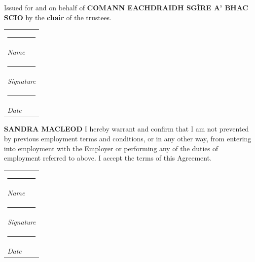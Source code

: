 \documentclass[a4paper,11pt,onecolumn ]{article}
\makeatletter
\newcommand{\namesigdate}[2][5cm]{%
  \begin{tabular}{@{}p{#1}@{}}
    #2 \\[2\normalbaselineskip] \hrule \\[0pt]
    {\small \textit{Name}} \\[2\normalbaselineskip] \hrule \\[0pt]
    {\small \textit{Signature}} \\[2\normalbaselineskip] \hrule \\[0pt]
    {\small \textit{Date}}
  \end{tabular}
}
\makeatother
\begin{document}
\begin{center}
    
\begin{multicols}{2}
\begin{center}
Issued for and on behalf of \textbf{COMANN EACHDRAIDH SGÌRE A' BHAC SCIO} by the
\textbf{chair} of the trustees.
\end{center}


\noindent
\namesigdate{}

\columnbreak

\begin{center}
\textbf{SANDRA MACLEOD}
I hereby warrant and confirm that I am not prevented by previous employment terms
and conditions, or in any other way, from entering into employment with the Employer
or performing any of the duties of employment referred to above. I accept the terms of
this Agreement.
\end{center}

\noindent
\namesigdate{}


\end{multicols}

\end{center}
\end{document}

